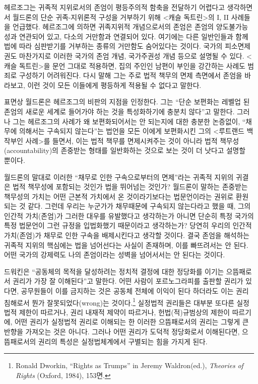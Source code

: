 헤르조그는 귀족적 지위로서의 존엄이 평등주의적 함축을 전달하기 어렵다고 생각하면서 월드론의 단순 귀족-지위론적 구성을 거부하기 위해 \textless 캐슬 독트린\textgreater 의 I, II 사례들을 언급했다. 헤르조그에 의하면 귀족지위적 개념으로서의 존엄은 존엄의 양도불가능성과 연관되어 있고, 다소의 거만함과 연결되어 있다. 여기에는 다른 일반인들과 함께 법에 따라 심판받기를 거부하는 종류의 거만함도 숨어있다는 것이다. 국가의 피소면제권도 마찬가지로 이러한 국가의 존엄 개념, 국가주권성 개념 등으로 설명될 수 있다. \textless 캐슬 독트린\textgreater 을 문언 그대로 적용하면, 집의 주인인 남편이 부인을 강간하는 사례도 범죄로 구성하기 어려워진다. 다시 말해 그는 주로 법적 책무의 면제 측면에서 존엄을 바라보고, 이런 것이 모든 이들에게 평등하게 적용될 수 없다고 말한다.

표면상 월드론은 헤르조그의 비판의 지점을 인정한다. 그는 ``단순 보편화는 레벨업 된 존엄의 새로운 세계로 들어가야 하는 것을 특성화하기에 충분치 않다''고 말한다. 그러나 그는 헤르조그의 사례가 왜 보편화되어서는 안 되는지에 대한 충분한 논증없이, ``채무에 의해서는 구속되지 않는다''는 법언을 모든 이에게 보편화시킨 그의 \textless 루트랜드 백작부인 사례\textgreater 를 들면서, 이는 법적 책무를 면제시켜주는 것이 아니라 법적 책무성(accountability)의 존중받는 형태를 일반화하는 것으로 보는 것이 더 낫다고 설명할 뿐이다.

월드론의 말대로 이러한 ``채무로 인한 구속으로부터의 면제''라는 귀족적 지위의 귀결은 법적 책무성에 포함되는 것인가 법을 뛰어넘는 것인가? 월드론이 말하는 존중받는 책무성의 가치는 어떤 근본적 가치에서 온 것이라기보다는 법문언이라는 권위로 환원되는 것 같다. 그런데 우리는 누군가가 채무때문에 구속되지 않는다라고 했을 때, 그의 인간적 가치(존엄)가 그러한 대우를 유발했다고 생각하는가 아니면 단순히 특정 국가의 특정 법문언이 그런 규정을 입법화했기 때문이라고 생각하는가? 당연히 우리의 인간적 가치(존엄)가 채무로 인한 구속을 배제시킨다고 생각할 것이다. 결국 존엄을 해석하는 귀족적 지위의 핵심에는 법을 넘어선다는 사실이 존재하며, 이를 빠뜨려서는 안 된다. 어떤 국가의 강제력도 나의 존엄이라는 성벽을 넘어서서는 안 된다는 것이다.

드워킨은 ``공동체의 목적을 달성하려는 정치적 결정에 대한 정당화를 이기는 으뜸패로서 권리가 가장 잘 이해된다''고 말한다. 어떤 사람이 포르노그라피를 출판할 권리가 있다면, 공무원들이 이를 금지하는 것은 공동체 전체에 이익이 된다 하더라도 이는 권리 침해로서 뭔가 잘못되었다(wrong)는 것이다.\footnote{Ronald Dworkin, ``Rights as Trumps'' in Jeremy Waldron(ed.), \emph{Theories of Rights} (Oxford, 1984), 153면.} 실정법적 권리들은 대부분 또다른 실정법적 제한이 따르거나, 권리 내재적 제약이 따르거나, 헌법(적)규범상의 제한이 따르기에, 어떤 권리가 실정법적 권리로 이해되는 한 이러한 으뜸패로서의 권리는 그렇게 큰 반향을 가져오는 것은 아니다. 그러나 어떤 권리가 도덕적 정당화로서 이해된다면, 으뜸패로서의 권리의 특성은 실정법체계에서 구별되는 힘을 가지게 된다.

